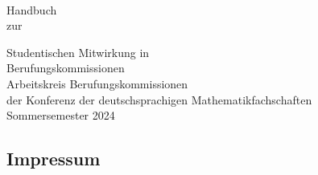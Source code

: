 \frontmatter
{}
\clearpage{}
\thispagestyle{empty}~
\clearpage{}


\begin{titlepage}
    \begin{flushright}\sffamily
        \vspace*{1cm}
        {\Huge{Handbuch}}\\
        \vspace{2.0cm}
        {\large zur}\smallskip\par
        {\huge{Studentischen Mitwirkung in}\medskip \\
        {\huge Berufungskommissionen}} \\
        \vspace{2ex}
        \vfill
        {\large{Arbeitskreis Berufungskommissionen}\smallskip \\
        {\large{der Konferenz der deutschsprachigen Mathematikfachschaften}}\\
        \vspace{3cm}
        {\Large Sommersemester 2024}}\\
        \vspace{14ex}
    \end{flushright}
\end{titlepage}


\clearpage{}
\vspace*{\fill}
\subsection*{Impressum}

